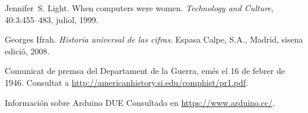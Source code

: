 \begin{thebibliography}{10}

Jennifer~S. Light.
\newblock When computers were women.
\newblock \textit{Technology and Culture}, 40:3:455--483, juliol, 1999.

Georges Ifrah.
\newblock \textit{Historia universal de las cifras}.
\newblock Espasa Calpe, S.A., Madrid, sisena edició, 2008.

Comunicat de premsa del Departament de la Guerra, 
emés el 16 de febrer de 1946. 
\newblock Consultat a 
\url{http://americanhistory.si.edu/comphist/pr1.pdf}.

Información sobre Arduino DUE
\newblock Consultado en 
\url{https://www.arduino.cc/}.



\end{thebibliography}